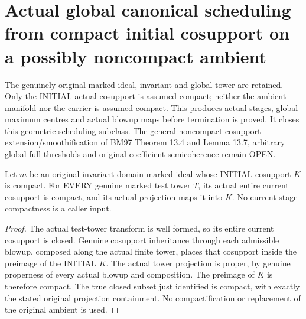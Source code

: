 \section{Actual global canonical scheduling from compact initial cosupport on a possibly noncompact ambient}

The genuinely original marked ideal, invariant and global tower are retained.
Only the INITIAL actual cosupport is assumed compact; neither the ambient
manifold nor the carrier is assumed compact. This produces actual stages,
global maximum centres and actual blowup maps before termination is proved.
It closes this geometric scheduling subclass. The general noncompact-cosupport
extension/smoothification of BM97 Theorem 13.4 and Lemma 13.7, arbitrary global
full thresholds and original coefficient semicoherence remain OPEN.

\begin{lemma}
\label{hir:original-compact-cosupport-current-compact}
\leanok
Let $m$ be an original invariant-domain marked ideal whose INITIAL cosupport
$K$ is compact. For EVERY genuine marked test tower $T$, its actual entire
current cosupport is compact, and its actual projection maps it into $K$.
No current-stage compactness is a caller input.
\end{lemma}
\begin{proof}
The actual test-tower transform is well formed, so its entire current
cosupport is closed. Genuine cosupport inheritance through each admissible
blowup, composed along the actual finite tower, places that cosupport inside
the preimage of the INITIAL $K$. The actual tower projection is proper,
by genuine properness of every actual blowup and composition. The preimage
of $K$ is therefore compact. The true closed subset just identified is
compact, with exactly the stated original projection containment. No
compactification or replacement of the original ambient is used.
\end{proof}

